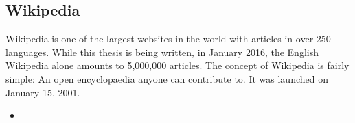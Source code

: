 \subsection{Wikipedia}
Wikipedia is one of the largest websites in the world with articles in over 250 languages. While this thesis is being written, in January 2016, the English Wikipedia alone amounts to 5,000,000 articles. 
The concept of Wikipedia is fairly simple: An open encyclopaedia anyone can contribute to. It was launched on January 15, 2001. 

\begin{itemize}
\item
\end{itemize}

